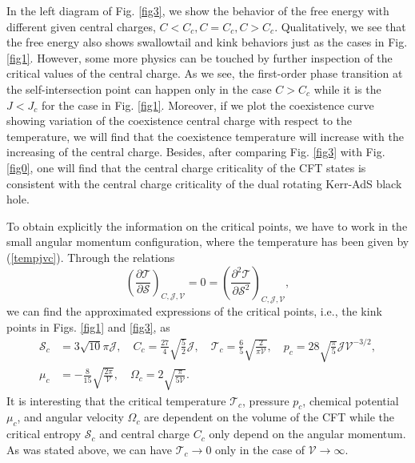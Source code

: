 \documentclass[a4paper,11pt]{article}
\newcommand{\eq}[1]{(\ref{#1})}
\newcommand{\fig}[1]{Fig. \ref{#1}}
\def\T{\mathcal{T}} \def\O{\mathcal{O}} \def\S{\mathcal{S}}\def\J{\mathcal{J}}\def\V{\mathcal{V}}\def\Q{\mathcal{Q}}\def\F{\mathcal{F}}
\begin{document}
In the left diagram of \fig{fig3}, we show the behavior of the free energy with different given central charges, $C<C_c, C=C_c, C>C_c$.  Qualitatively, we see that the free energy also shows swallowtail and kink behaviors just as the cases in \fig{fig1}. However, some more physics can be touched by further inspection of the critical values of the central charge. As we see, the first-order phase transition at the self-intersection point can happen only in the case $C>C_c$ while it is the $J<J_c$ for the case in \fig{fig1}. Moreover, if we plot the coexistence curve showing variation of the coexistence central charge with respect to the temperature, we will find that the coexistence temperature will increase with the increasing of the central charge. Besides, after comparing \fig{fig3} with \fig {fig0}, one will find that the central charge criticality of the CFT states is consistent with the central charge criticality of the dual rotating Kerr-AdS black hole.



To obtain explicitly the information on the critical points, we have to work in the small angular momentum configuration, where the temperature has been given by \eq{tempjvc}. Through the relations
\begin{equation}\label{crit}
\left(\frac{\partial \mathcal{T}}{\partial \mathcal{S}}\right)_{C,\mathcal{J},\V}=0=\left(\frac{\partial^2 \mathcal{T}}{\partial \mathcal{S}^2}\right)_{C,\mathcal{J},\V} ,
\end{equation}
we can find the approximated expressions of the critical points, i.e., the kink points in Figs. \ref{fig1} and \ref{fig3}, as
\begin{equation}\label{crip}
\begin{aligned}
\mathcal{S}_c&=3 \sqrt{10} \pi  \mathcal{J},\quad C_c=\frac{27}{4} \sqrt{\frac{5}{2}} \mathcal{J},\quad \mathcal{T}_c=\frac{6}{5} \sqrt{\frac{2}{\pi  \mathcal{V}}},\quad p_c=28 \sqrt{\frac{\pi }{5}} \mathcal{J} \mathcal{V}^{-3/2},\\ \mu_{c}&=-\frac{8}{15} \sqrt{\frac{2 \pi }{\mathcal{V}}},\quad \Omega_{c}=2 \sqrt{\frac{\pi }{5 \mathcal{V}}}.
\end{aligned}
\end{equation}
It is interesting that the critical temperature $\T_c$, pressure $p_c$, chemical potential $\mu_{c}$, and angular velocity $\Omega_{c}$ are dependent on the volume of the CFT while the critical entropy $\S_c$ and  central charge $C_c$ only depend on the angular momentum. As was stated above, we can have $\T_c\to 0$ only in the case of $\V\to \infty$.
\end{document}
